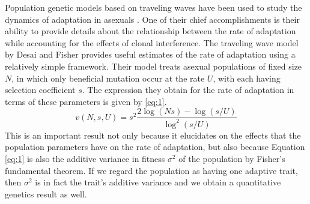 \documentclass[11pt,twocolumn]{article}
\begin{document}
Population genetic models based on traveling waves have been used to study the dynamics of adaptation in asexuals \citep{rouzine2003solitary,desai2007beneficial}. One of their chief accomplishments is their ability to provide details  about the relationship between the rate of adaptation while accounting for the effects of clonal interference. The traveling wave model by Desai and Fisher provides useful estimates of the rate of adaptation using a relatively simple framework. Their model treats asexual populations of fixed size $N$, in which only beneficial mutation occur at the rate $U$, with each having selection coefficient $s$. The expression they obtain for the rate of adaptation in terms of these parameters is given by \eqref{eq:1}. 
\begin{equation}\label{eq:1}
v(N,s,U) = s^2\frac{2\log(N s)-\log(s/U)}{\log^2(s/U)}
\end{equation} 
This is an important result not only because it elucidates on the effects that the population parameters have on the rate of adaptation, but also because Equation \eqref{eq:1} is also the additive variance in fitness $\sigma^2$ of the population by Fisher's fundamental theorem. If we regard the population as having one adaptive trait, then $\sigma^2$ is in fact the trait's additive variance and we obtain a quantitative genetics result as well.\par
% 
% 
% 
%
\end{document}
